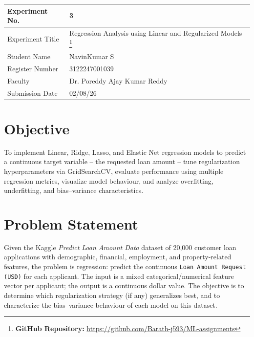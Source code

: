 \documentclass[12pt,a4paper]{article}
\begin{document}
\begin{tabular}{|p{4cm}|p{11cm}|}
\hline
Experiment No. & 3 \\ \hline
Experiment Title & Regression Analysis using Linear and Regularized Models
\footnote{\textbf{GitHub Repository: }\url{https://github.com/Barath-j593/ML-assignments}}\\ \hline
Student Name & NavinKumar S \\ \hline
Register Number & 3122247001039\\ \hline
Faculty & Dr. Poreddy Ajay Kumar Reddy \\ \hline
Submission Date & 02/08/26 \\ \hline
\end{tabular}

\section{Objective}
To implement Linear, Ridge, Lasso, and Elastic Net regression models to predict a continuous
target variable -- the requested loan amount -- tune regularization hyperparameters via
GridSearchCV, evaluate performance using multiple regression metrics, visualize model
behaviour, and analyze overfitting, underfitting, and bias--variance characteristics.

\section{Problem Statement}
Given the Kaggle \textit{Predict Loan Amount Data} dataset of 20,000 customer loan
applications with demographic, financial, employment, and property-related features, the
problem is regression: predict the continuous \texttt{Loan Amount Request (USD)} for each
applicant. The input is a mixed categorical/numerical feature vector per applicant; the
output is a continuous dollar value. The objective is to determine which regularization
strategy (if any) generalizes best, and to characterize the bias--variance behaviour of each
model on this dataset.
\end{document}
